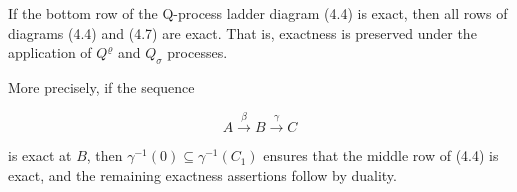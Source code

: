 If the bottom row of the Q-process ladder diagram (4.4) is exact, then all rows of diagrams (4.4) and (4.7) are exact. That is, exactness is preserved under the application of $Q^{\varrho}$ and $Q_{\sigma}$ processes.

More precisely, if the sequence

$$A \xrightarrow{\beta} B \xrightarrow{\gamma} C$$

is exact at $B$, then $\gamma^{-1}(0) \subseteq \gamma^{-1}(C_1)$ ensures that the middle row of (4.4) is exact, and the remaining exactness assertions follow by duality.
